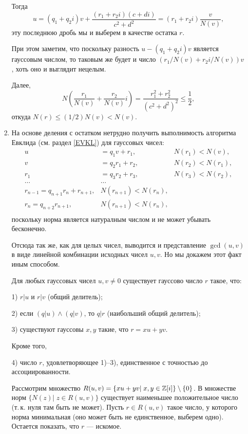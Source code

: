 \begin{enumerate}
Тогда
$$
u=(q_1+q_2i)v+\frac{(r_1+r_2i)(c+di)}{c^2+d^2}=(r_1+r_2i)\frac{v}{N(v)},
$$
эту последнюю дробь мы и выберем в качестве остатка $r$.

При этом заметим, что поскольку разность $u-(q_1+q_2i)v$ является гауссовым числом, то таковым же будет и число $(r_1/N(v)+r_2i/N(v))v$, хоть оно и выглядит нецелым.

Далее,
$$
N\left(\frac{r_1}{N(v)}+\frac{r_2}{N(v)}i\right)=\frac{r_1^2+r_2^2}{(c^2+d^2)^2}\le \frac 12,
$$
откуда $N(r)\le (1/2)N(v)<N(v)$.

\item На основе деления с остатком нетрудно получить выполнимость алгоритма Евклида (см. раздел \ref{EVKL}) для гауссовых чисел:
\begin{align*}
u & = q_1v + r_1, &  N(r_1)<N(v),\\
v & = q_2r_1 + r_2, &  N(r_2)<N(r_1),\\
r_1 & = q_3r_2 + r_3, &  N(r_3)<N(r_2),\\
\dots & \dots & \\
r_{n-1} = q_{n+1}r_n + r_{n+1}, &  N(r_{n+1})<N(r_n),\\
r_{n} = q_{n+2}r_{n+1}, &  N(r_{n+1})<N(r_n),\\
\end{align*}
поскольку норма является натуралным числом и не может убывать бесконечно.

Отсюда так же, как для целых чисел, выводится и представление $\gcd(u,v)$ в виде линейной комбинации исходных чисел $u,v$. Но мы докажем этот факт иным способом.
\begin{lem}\label{NOD}
Для любых гауссовых чисел $u,v\ne 0$ существует гауссово число $r$ такое, что:

\textup{1)} $r|u$ и $r|v$ (общий делитель);

\textup{2)} если $(q|u)\wedge(q|v)$, то $q|r$ (наибольший общий делитель);

\textup{3)} существуют гауссовы $x,y$ такие, что $r=xu+yv$.

\noindent Кроме того,

\textup{4)} число $r$, удовлетворяющее \textup{1)--3)}, единственное с точностью до ассоциированности.
\end{lem}
\pf
Рассмотрим множество $R(u,v)=\{xu+yv|\;x,y\in\mathbb Z[i]\}\setminus\{0\}$. В множестве норм $\{N(z)|\;z\in R(u,v)\}$ существует наименьшее положительное число (т.\,к. нуля там быть не может). Пусть $r\in R(u,v)$ такое число, у которого норма минимальная (оно может быть не единственное, выберем одно). Остается показать, что $r$ --- искомое.


\end{enumerate}
